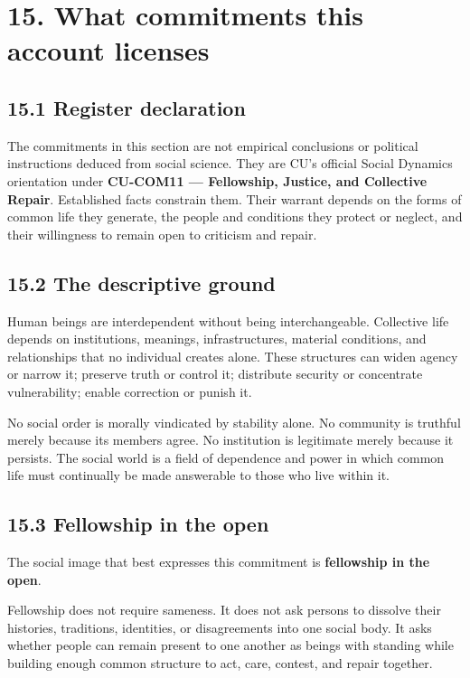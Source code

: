 \documentclass[
  11pt,
]{article}
\begin{document}
\section{15. What commitments this account
licenses}\label{what-commitments-this-account-licenses}

\subsection{15.1 Register declaration}\label{register-declaration}

The commitments in this section are not empirical conclusions or
political instructions deduced from social science. They are CU's
official Social Dynamics orientation under \textbf{CU-COM11 ---
Fellowship, Justice, and Collective Repair}. Established facts constrain
them. Their warrant depends on the forms of common life they generate,
the people and conditions they protect or neglect, and their willingness
to remain open to criticism and repair.

\subsection{15.2 The descriptive ground}\label{the-descriptive-ground}

Human beings are interdependent without being interchangeable.
Collective life depends on institutions, meanings, infrastructures,
material conditions, and relationships that no individual creates alone.
These structures can widen agency or narrow it; preserve truth or
control it; distribute security or concentrate vulnerability; enable
correction or punish it.

No social order is morally vindicated by stability alone. No community
is truthful merely because its members agree. No institution is
legitimate merely because it persists. The social world is a field of
dependence and power in which common life must continually be made
answerable to those who live within it.

\subsection{15.3 Fellowship in the open}\label{fellowship-in-the-open}

The social image that best expresses this commitment is
\textbf{fellowship in the open}.

Fellowship does not require sameness. It does not ask persons to
dissolve their histories, traditions, identities, or disagreements into
one social body. It asks whether people can remain present to one
another as beings with standing while building enough common structure
to act, care, contest, and repair together.
\end{document}
